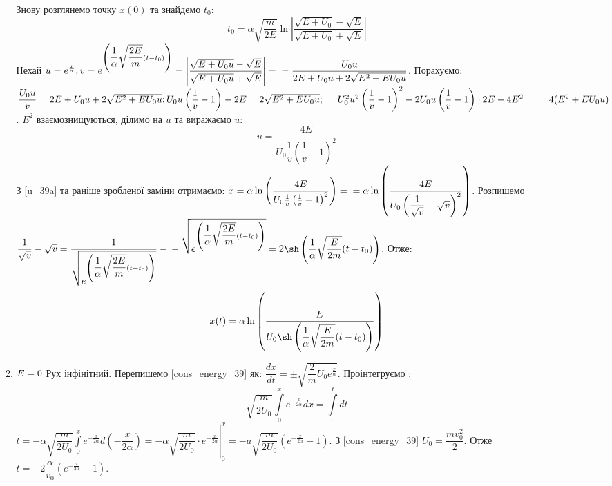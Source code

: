 \documentclass[a4paper,12pt]{article}
\newcommand\tab [1][0.5cm]{\hspace*{#1}}
\newcommand\dint{\displaystyle\int}
\begin{document}
\begin{justify}
\begin{itemize}
\begin{enumerate}[label=(\alph*)]
\begin{equation}
						\label{t_39}
					\end{equation}
					Знову розглянемо точку $x(0)$ та знайдемо $t_0$: 
					\begin{equation}
						t_0=\alpha\sqrt{\dfrac{m}{2E}}\ln\left|\dfrac{\sqrt{E+U_0}-\sqrt{E}}{\sqrt{E+U_0}+\sqrt{E}}\right|
						\label{t0const_39a}
					\end{equation}
					Нехай $u=e^{\frac{x}{\alpha}}; v=e^{\left(\dfrac{1}{\alpha}\sqrt{\dfrac{2E}{m}}(t-t_0)\right)}=\left|\dfrac{\sqrt{E+U_0u}-\sqrt{E}}{\sqrt{E+U_0u}+\sqrt{E}}\right|=\\=\dfrac{U_0u}{2E+U_0u+2\sqrt{E^2+EU_0u}}$. Порахуємо: $\dfrac{U_0u}{v}=2E+U_0u+2\sqrt{E^2+EU_0u};\\ U_0u\left(\dfrac{1}{v}-1\right)-2E=2\sqrt{E^2+EU_0u};\tab U_0^2u^2\left(\dfrac{1}{v}-1\right)^2-2U_0u\left(\dfrac{1}{v}-1\right)\cdot2E-4E^2=\\=4(E^2+EU_0u)$. $E^2$ взаємознищуються, ділимо на $u$ та виражаємо $u$:
					\begin{equation}
						u=\dfrac{4E}{U_0\dfrac{1}{v}\left(\dfrac{1}{v}-1\right)^2}
						\label{u_39a}
					\end{equation}
					З \ref{u_39a} та раніше зробленої заміни отримаємо: $x=\alpha\ln\left(\dfrac{4E}{U_0\frac{1}{v}\left(\frac{1}{v}-1\right)^2}\right)=\\=\alpha\ln\left(\dfrac{4E}{U_0\left(\dfrac{1}{\sqrt{v}}-\sqrt{v}\right)^2}\right)$. Розпишемо $\dfrac{1}{\sqrt{v}}-\sqrt{v}=\dfrac{1}{\sqrt{e^{\left(\dfrac{1}{\alpha}\sqrt{\dfrac{2E}{m}}(t-t_0)\right)}}}-\\-\sqrt{e^{\left(\dfrac{1}{\alpha}\sqrt{\dfrac{2E}{m}}(t-t_0)\right)}}=2\sh\left(\dfrac{1}{\alpha}\sqrt{\dfrac{E}{2m}}(t-t_0)\right)$. Отже:
					\begin{equation}
						x(t)=\alpha\ln\left(\dfrac{E}{U_0\sh\left(\dfrac{1}{\alpha}\sqrt{\dfrac{E}{2m}}(t-t_0)\right)}\right)
						\label{x_39a}
					\end{equation}  
				\item $E=0\\$
					Рух інфінітний. Перепишемо \ref{cons_energy_39} як: $\dfrac{dx}{dt}=\pm\sqrt{\dfrac{2}{m}U_0e^{\frac{x}{\alpha}}}$. Проінтегруємо :
					\begin{equation}
						\sqrt{\dfrac{m}{2U_0}}\dint\limits_0^xe^{-\frac{x}{2\alpha}}dx=\dint\limits_0^tdt
						\label{int_39b}
					\end{equation} 
					$t=-\alpha\sqrt{\dfrac{m}{2U_0}}\dint\limits_0^xe^{-\frac{x}{2\alpha}}d\left(-\dfrac{x}{2\alpha}\right)=\left.-\alpha\sqrt{\dfrac{m}{2U_0}}\cdot e^{-\frac{x}{2\alpha}}\right|_0^x=-a\sqrt{\dfrac{m}{2U_0}}\left(e^{-\frac{x}{2\alpha}}-1\right)$. З \ref{cons_energy_39} $U_0=\dfrac{mv_0^2}{2}$. Отже $t=-2\dfrac{\alpha}{v_0}\left(e^{-\frac{x}{2\alpha}}-1\right)$.

\end{enumerate}
\end{itemize}
\end{justify}
\end{document}
